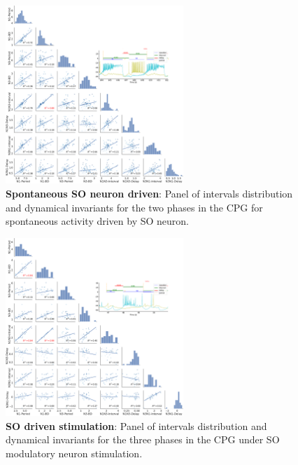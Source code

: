  


\begin{figure}[htbp]
	\centering
	\includegraphics[width=0.6\textwidth]{./invariants/data/SUSSEX/prep4_so_driven_2/images/panel_with_pairplot.pdf}
	\caption{\textbf{Spontaneous SO neuron driven}: Panel of intervals distribution and dynamical invariants for the two phases in the CPG for spontaneous activity driven by SO neuron.}
	\label{fig:so spontaneous invariants pairplot 2}
\end{figure}


\begin{figure}[htbp]
	\centering
	\includegraphics[width=0.6\textwidth]{./invariants/data/SUSSEX/SO_driven/images/panel_with_pairplot.pdf}
	\caption{\textbf{SO driven stimulation}: Panel of intervals distribution and dynamical invariants for the three phases in the CPG under SO modulatory neuron stimulation.}
	\label{fig:so stimulation pairplot}
\end{figure}



